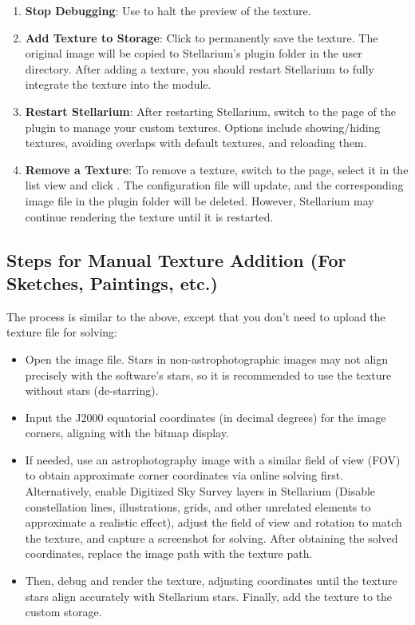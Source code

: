 \begin{enumerate}
    \item \textbf{Stop Debugging}: Use  to halt the preview of the texture.

    \item \textbf{Add Texture to Storage}: Click  to permanently save 
	the texture. The original image will be copied to Stellarium's plugin folder in the user 
	directory. After adding a texture, you should restart Stellarium to fully integrate the texture into the module.

    \item \textbf{Restart Stellarium}: After restarting Stellarium, switch to the  page of the 
	plugin to manage your custom textures. Options include showing/hiding textures, avoiding 
	overlaps with default textures, and reloading them.

    \item \textbf{Remove a Texture}: To remove a texture, switch to the  page, select it in 
	the list view and click . The configuration file 
	will update, and the corresponding image file in the plugin folder will be deleted. However, 
	Stellarium may continue rendering the texture until it is restarted.
\end{enumerate}

\subsection{Steps for Manual Texture Addition (For Sketches, Paintings, etc.)}
The process is similar to the above, except that you don’t need to upload the texture file for solving:
\begin{itemize}
    \item Open the image file. Stars in non-astrophotographic images may not align precisely with the 
	software's stars, so it is recommended to use the texture without stars (de-starring).
    \item Input the J2000 equatorial coordinates (in decimal degrees) for the image corners, aligning 
	with the bitmap display.
    \item If needed, use an astrophotography image with a similar field of view (FOV) to obtain 
	approximate corner coordinates via online solving first. Alternatively, enable Digitized 
	Sky Survey layers in Stellarium (Disable constellation lines, illustrations, grids, and other 
	unrelated elements to approximate a realistic effect), adjust the field of view and rotation 
	to match the texture, and capture a screenshot for solving. After obtaining the solved 
	coordinates, replace the image path with the texture path.
    \item Then, debug and render the texture, adjusting coordinates until the texture stars align 
	accurately with Stellarium stars. Finally, add the texture to the custom storage.
\end{itemize}

